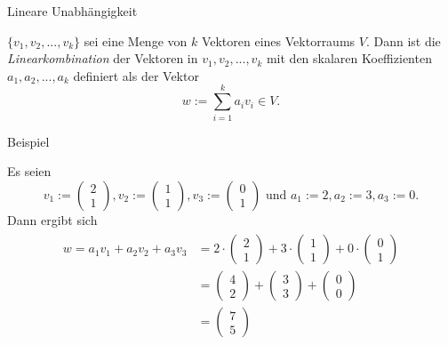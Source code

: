 \documentclass[
  8pt,
  ignorenonframetext,
]{beamer}
\begin{document}
\begin{frame}{Lineare Unabhängigkeit}
\protect\hypertarget{lineare-unabhuxe4ngigkeit}{}
\small
\begin{definition}[Linearkombination]
\justifying
$\{v_1, v_2, ..., v_k\}$ sei eine Menge von $k$ Vektoren eines Vektorraums $V$.
Dann ist die \textit{Linearkombination} der Vektoren in $v_1, v_2, ..., v_k$ mit den
skalaren Koeffizienten $a_1, a_2,...,a_k$ definiert als der Vektor
\begin{equation}
w := \sum_{i=1}^k a_i v_i \in V.
\end{equation}
\end{definition}

\footnotesize

Beispiel

Es seien \begin{equation}
v_1 := \begin{pmatrix} 2 \\ 1 \end{pmatrix},
v_2 := \begin{pmatrix} 1 \\ 1 \end{pmatrix},
v_3 := \begin{pmatrix} 0 \\ 1 \end{pmatrix}
\mbox{ und }
a_1 := 2, a_2 := 3, a_3 := 0.
\end{equation} Dann ergibt sich \begin{align}
\begin{split}
w
  = a_1v_1 + a_2v_2 + a_3v_3
& =  2 \cdot \begin{pmatrix} 2 \\ 1 \end{pmatrix}
   + 3 \cdot \begin{pmatrix} 1 \\ 1 \end{pmatrix}
   + 0 \cdot \begin{pmatrix} 0 \\ 1 \end{pmatrix}   \\
& =   \begin{pmatrix} 4 \\ 2 \end{pmatrix}
    + \begin{pmatrix} 3 \\ 3 \end{pmatrix}
    + \begin{pmatrix} 0 \\ 0 \end{pmatrix}   \\
& =   \begin{pmatrix} 7 \\ 5 \end{pmatrix}
\end{split}
\end{align}
\end{frame}
\end{document}

